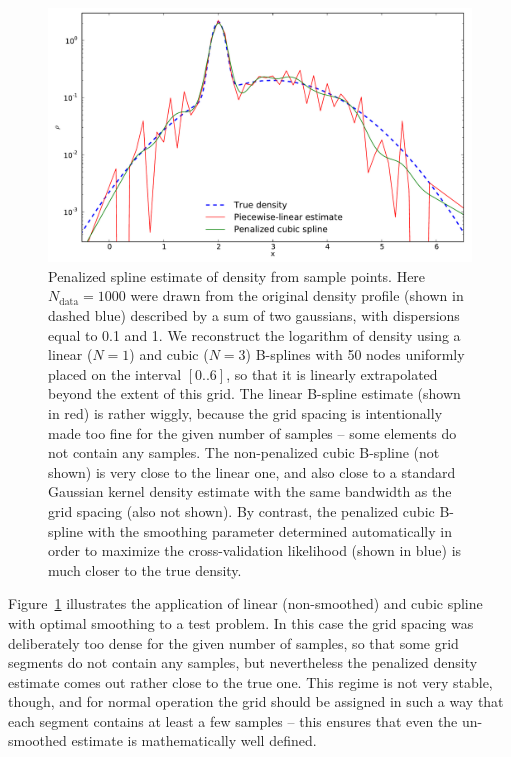 \documentclass[12pt]{article}
\begin{document}
\begin{figure}[t]
\begin{center}
\includegraphics[width=12cm]{SplineLogDensity.pdf}
\end{center}
\caption{Penalized spline estimate of density from sample points. Here $N_\mathrm{data}=1000$ were drawn from the original density profile (shown in dashed blue) described by a sum of two gaussians, with dispersions equal to 0.1 and 1. We reconstruct the logarithm of density using a linear ($N=1$) and cubic ($N=3$) B-splines with 50 nodes uniformly placed on the interval $[0..6]$, so that it is linearly extrapolated beyond the extent of this grid. The linear B-spline estimate (shown in red) is rather wiggly, because the grid spacing is intentionally made too fine for the given number of samples -- some elements do not contain any samples. The non-penalized cubic B-spline (not shown) is very close to the linear one, and also close to a standard Gaussian kernel density estimate with the same bandwidth as the grid spacing (also not shown). By contrast, the penalized cubic B-spline with the smoothing parameter determined automatically in order to maximize the cross-validation likelihood (shown in blue) is much closer to the true density.
} \label{fig:SplineLogDensity}
\end{figure}

Figure~\ref{fig:SplineLogDensity} illustrates the application of linear (non-smoothed) and cubic spline with optimal smoothing to a test problem. In this case the grid spacing was deliberately too dense for the given number of samples, so that some grid segments do not contain any samples, but nevertheless the penalized density estimate comes out rather close to the true one.
This regime is not very stable, though, and for normal operation the grid should be assigned in such a way that each segment contains at least a few samples -- this ensures that even the un-smoothed estimate is mathematically well defined.
\end{document}
